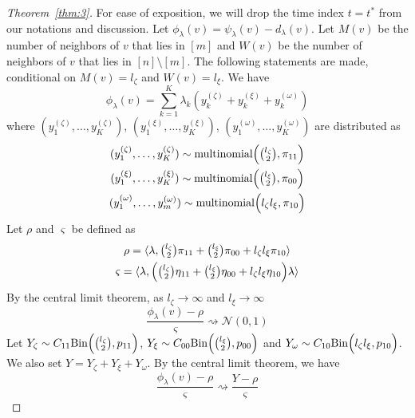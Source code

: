 \documentclass[draftcls]{IEEEtran}
\theoremstyle{definition}
\begin{document}
\begin{proof}[Theorem~\ref{thm:3}]
  For ease of exposition, we will drop the time index $t =
  t^{*}$ from our notations and discussion. Let
  $\phi_{\lambda}(v) = \psi_{\lambda}(v) - d_{\lambda}(v)$. Let
  $M(v)$ be the number of neighbors of $v$ that lies in $[m]$ and
  $W(v)$ be the number of neighbors of $v$ that lies in $[n]
\setminus [m]$. The following statements are made, conditional on
$M(v) = l_{\zeta}$ and $W(v) = l_{\xi}$. We have
\begin{equation}
  \phi_{\lambda}(v) = \sum_{k=1}^{K} \lambda_k ( y^{(\zeta)}_k +
  y^{(\xi)}_k + y^{(\omega)}_k)
\end{equation}
where $(y^{(\zeta)}_1, \dots, y^{(\zeta)}_K)$, $(y^{(\xi)}_1,\dots,
 y^{(\xi)}_K)$,  $(y^{(\omega)}_1, \dots, y^{(\omega)}_K)$ are
 distributed as
\begin{gather*}
(y^{(\zeta)}_1,\dots,y^{(\zeta)}_K) \sim \textrm{multinomial}\Bigl(
\tbinom{l_\zeta}{2}, \pi_{11}\Bigr) \\ 
(y^{(\xi)}_1,\dots,y^{(\xi)}_K) \sim \textrm{multinomial}\Bigl(
\tbinom{l_\xi}{2}, \pi_{00}\Bigr) \\
(y^{(\omega)}_1,\dots,y^{(\omega)}_m) \sim \textrm{multinomial}\Bigl(
l_\zeta l_\xi, \pi_{10}\Bigr)
\end{gather*}
Let $\rho$ and $\varsigma$ be defined as
\begin{gather*}
  \rho = \langle \lambda, \tbinom{l_{\zeta}}{2} \pi_{11} +
  \tbinom{l_{\xi}}{2} \pi_{00} + l_{\zeta} l_{\xi} \pi_{10} \rangle \\
  \varsigma = \langle \lambda, \Bigl(\tbinom{l_{\zeta}}{2} \eta_{11} +
  \tbinom{l_{\xi}}{2} \eta_{00} + l_{\zeta} l_{\xi} \eta_{10}\Bigr) \lambda
  \rangle
\end{gather*}
By the central limit theorem, as $l_{\zeta} \rightarrow
\infty$ and $l_{\xi} \rightarrow \infty$
\begin{equation}
  \label{eq:16}
  \frac{\phi_{\lambda}(v) - \rho}{\varsigma} \rightsquigarrow
  \mathcal{N}(0,1)
\end{equation}
Let $Y_{\zeta} \sim C_{11} \mathrm{Bin}\Bigl(\tbinom{l_{\zeta}}{2},
p_{11}\Bigr)$, $Y_{\xi} \sim C_{00} \mathrm{Bin}\Bigl(\tbinom{l_\xi}{2},
p_{00}\Bigr)$ and $Y_{\omega} \sim C_{10} \mathrm{Bin}\Bigl( l_{\zeta}
l_{\xi}, p_{10} \Bigr)$. We also set $Y = Y_{\zeta} + Y_{\xi} +
Y_{\omega}$. By the central limit theorem, we have
\begin{equation}
  \label{eq:21}
 \frac{\phi_{\lambda}(v) - \rho}{\varsigma} \rightsquigarrow
 \frac{Y - \rho}{\varsigma}

\end{equation}
\end{proof}
\end{document}
